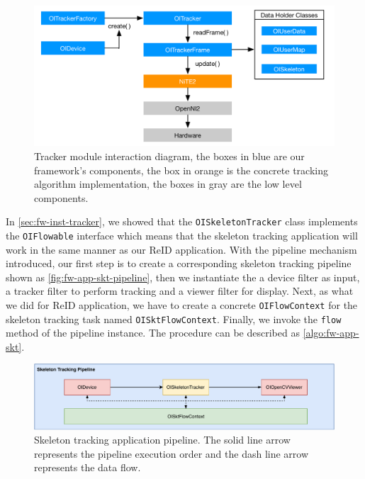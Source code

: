\begin{figure}
    \includegraphics[width=\linewidth]{figures/framework_oitracker_workflow.png}
    \caption[Tracker module interactive diagram]
    {Tracker module interaction diagram,
        the boxes in blue are our framework's components, the box in
        orange is the concrete tracking algorithm implementation, the boxes in
        gray are the low level components.}
    \label{fig:fw-skeleton-workflow}
\end{figure}

In \autoref{sec:fw-inst-tracker}, we showed that the \texttt{OISkeletonTracker}
class implements the \texttt{OIFlowable} interface which means that the
skeleton tracking application will work in the same manner as our ReID
application. With the pipeline mechanism introduced, our first step is to
create a corresponding skeleton tracking pipeline shown as
\autoref{fig:fw-app-skt-pipeline}, then we instantiate the a device filter as
input, a tracker filter to perform tracking and a viewer filter for display.
Next, as what we did for ReID application, we have to create a concrete
\texttt{OIFlowContext} for the skeleton tracking task named
\texttt{OISktFlowContext}.
Finally, we invoke the \texttt{flow} method of the pipeline instance.
The procedure can be described as \autoref{algo:fw-app-skt}.

\begin{figure}
    \centering
    \includegraphics[width=\linewidth]{figures/framework_app_skt_pipeline.pdf}
    \caption[Skeleton tracking application pipeline]
    {Skeleton tracking application pipeline. The solid line arrow represents
    the pipeline execution order and the dash line arrow represents the
    data flow.}
    \label{fig:fw-app-skt-pipeline}
\end{figure}

